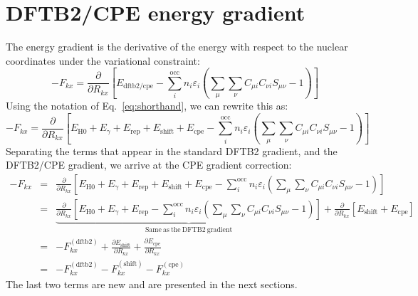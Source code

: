 \documentclass{article}
\numberwithin{equation}{section}
\begin{document}
\section{DFTB2/CPE energy gradient}
The energy gradient is the derivative of the energy with respect to the nuclear coordinates under the variational constraint:
\begin{equation}
    - F_{kx} = \frac{\partial}{\partial R_{kx}} \left[ E_\mathrm{{dftb2/cpe}} - \sum_i^\mathrm{occ} n_i \varepsilon_i \left(\sum_{\mu} \sum_{\nu} C_{\mu i} C_{\nu i} S_{\mu\nu} - 1  \right) \right]
\end{equation}
Using the notation of Eq.~\ref{eq:shorthand}, we can rewrite this as:
\begin{equation}
    - F_{kx} = \frac{\partial}{\partial R_{kx}} \left[  E_\mathrm{H0} + E_\gamma + E_\mathrm{rep} + E_\mathrm{shift} + E_\mathrm{cpe} - \sum_i^\mathrm{occ} n_i \varepsilon_i \left(\sum_{\mu} \sum_{\nu} C_{\mu i} C_{\nu i} S_{\mu\nu} - 1 \right) \right]
\end{equation}
Separating the terms that appear in the standard DFTB2 gradient, and the DFTB2/CPE gradient, we arrive at the CPE gradient correction:
\begin{eqnarray}
    - F_{kx} &=& \frac{\partial}{\partial R_{kx}} \left[  E_\mathrm{H0} + E_\gamma + E_\mathrm{rep} + E_\mathrm{shift} + E_\mathrm{cpe} - \sum_i^\mathrm{occ} n_i \varepsilon_i \left(\sum_{\mu} \sum_{\nu} C_{\mu i} C_{\nu i} S_{\mu\nu} - 1 \right) \right]\nonumber\\
             &=& \underbrace{\frac{\partial}{\partial R_{kx}} \left[  E_\mathrm{H0} + E_\gamma  + E_\mathrm{rep}- \sum_i^\mathrm{occ} n_i \varepsilon_i \left(\sum_{\mu} \sum_{\nu} C_{\mu i} C_{\nu i} S_{\mu\nu} - 1 \right) \right]}_{\mathrm{Same~as~the~DFTB2~gradient}}
    +\frac{\partial}{\partial R_{kx}} \left[  E_\mathrm{shift} + E_\mathrm{cpe} \right]\nonumber\\
    &=& -F_{kx}^\mathrm{(dftb2)} + \frac{\partial E_\mathrm{shift}}{\partial R_{kx}} + \frac{\partial E_\mathrm{cpe}}{\partial R_{kx}}\\
&=& - F_{kx}^\mathrm{(dftb2)}
     - F_{kx}^\mathrm{(shift)} 
     - F_{kx}^\mathrm{(cpe)}
\end{eqnarray}
The last two terms are new and are presented in the next sections.
\end{document}
